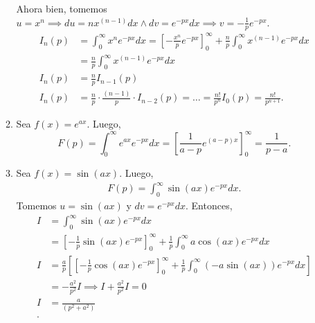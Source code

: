 \documentclass[12pt]{exam}
\begin{document}
\begin{enumerate}
\begin{enumerate}
      Ahora bien, tomemos $u = x^{n} \implies du = nx^{(n - 1)}dx \land dv = e^{-px}dx \implies v = - \frac{1}{p}e^{-px}$.
      \begin{align*}
	I_{n}\left( p \right) &= \int_{0}^{\infty}x^{n}e^{-px}dx = \left[ - \frac{x^{n}}{p} e^{-px} \right]_{0}^{\infty} + \frac{n}{p}\int_{0}^{\infty}x^{(n - 1)}e^{-px}dx\\
	&= \frac{n}{p}\int_{0}^{\infty}x^{(n - 1)}e^{-px}dx \\
	I_n\left( p \right) &= \frac{n}{p}I_{n - 1}\left( p \right)  \\
	I_n\left( p \right) &= \frac{n}{p}\cdot \frac{\left( n - 1 \right) }{p}\cdot I_{n - 2}\left( p \right) = \ldots = \frac{n!}{p^{n}}I_{0}\left( p \right) = \frac{n!}{p^{n + 1}}
      .\end{align*}
    \item Sea $f\left( x \right) = e^{ax}$. Luego,\[
    F\left( p \right) = \int_{0}^{\infty}e^{ax}e^{-px}dx = \left[ \frac{1}{a - p}e^{(a - p)x} \right]_{0}^{\infty} = \frac{1}{p - a}
    .\] 

  \item Sea $f\left( x \right) = \sin\left( ax \right) $. Luego,
    \begin{align*}
      F\left( p \right) = \int_{0}^{\infty} \sin\left( ax \right) e^{-px}dx
    .\end{align*}
    Tomemos $u = \sin\left( ax \right) $ y $dv = e^{-px}dx$. Entonces,
    \begin{align*}
      I &= \int_{0}^{\infty}\sin\left( ax \right) e^{-px}dx \\
      &= \left[ - \frac{1}{p}\sin\left( ax \right) e^{-px} \right]_{0}^{\infty} + \frac{1}{p}\int_{0}^{\infty}a\cos\left( ax \right) e^{-px}dx \\
      I &= \frac{a}{p}\left[ \left[ - \frac{1}{p}\cos\left( ax \right) e^{-px} \right]_{0}^{\infty} + \frac{1}{p}\int_{0}^{\infty}\left( -a \sin\left( ax \right)  \right) e^{-px}dx \right]  \\
      &= - \frac{a^2}{p^2}I \implies I + \frac{a^2}{p^2}I = 0 \\
      I &= \frac{a}{\left( p^2 + a^2 \right) } \\
    .\end{align*}


\end{enumerate}
\end{enumerate}
\end{document}
